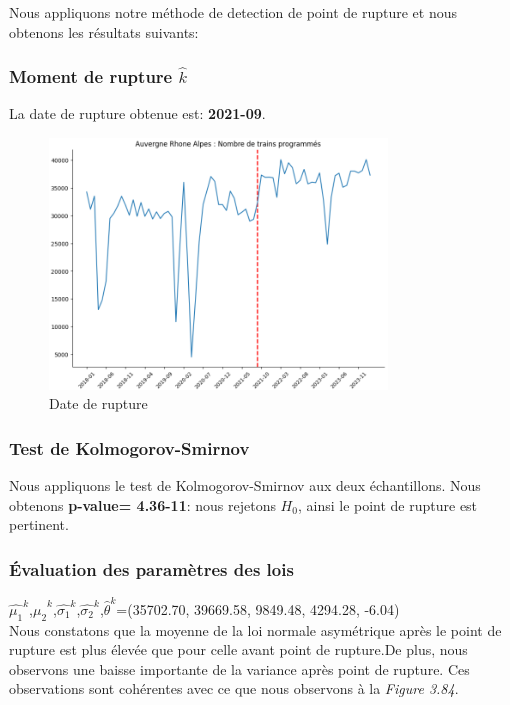 {Nous appliquons notre méthode de detection de point de rupture et nous obtenons les résultats suivants:

\subsubsection{Moment de rupture $\hat{k}$}

La date de rupture obtenue est: \textbf{2021-09}. 

\begin{figure}[H]
  \centering
  \includegraphics[width=0.8\textwidth]{image/ARA_TP_3.png}
  \caption{Date de rupture}
\end{figure}

\subsubsection{Test de Kolmogorov-Smirnov}

Nous appliquons le test de Kolmogorov-Smirnov aux deux échantillons. Nous obtenons \textbf{p-value=  4.36-11}: nous rejetons $H_0$, ainsi le point de rupture est pertinent.

\subsubsection{Évaluation des paramètres des lois}

$\hat{\mu_1}^k$,$\hat{\mu_2}^k$,$\hat{\sigma_1}^k$,$\hat{\sigma_2}^k$,$\hat{\theta}^k$=(35702.70, 39669.58, 9849.48, 4294.28, -6.04)\\

Nous constatons que la moyenne de la loi normale asymétrique après le point de rupture est  plus élevée que pour celle avant point de rupture.De plus, nous observons une baisse importante de la variance après point de rupture. Ces observations sont cohérentes avec ce que nous observons à la \textit{Figure 3.84}.\\


}
